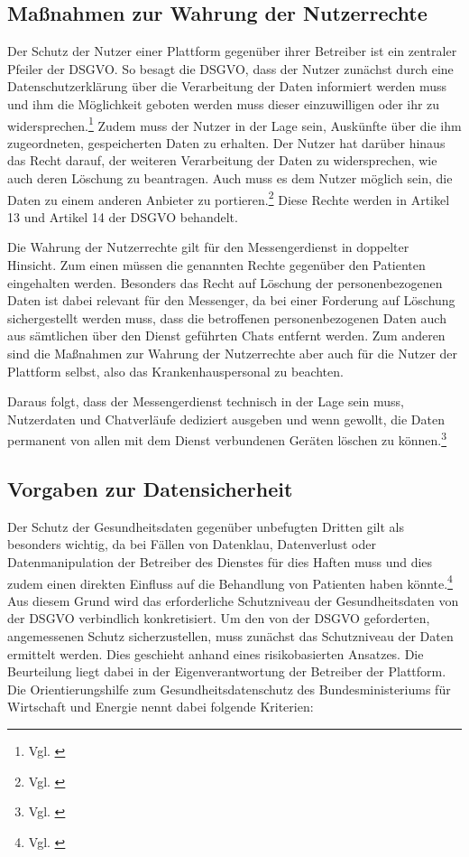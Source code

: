 \subsection{Maßnahmen zur Wahrung der Nutzerrechte}\label{subsection:mzwdn}
Der Schutz der Nutzer einer Plattform gegenüber ihrer Betreiber ist ein zentraler Pfeiler der DSGVO. So besagt die DSGVO, dass der Nutzer zunächst durch eine Datenschutzerklärung über die Verarbeitung der Daten informiert werden muss und ihm die Möglichkeit geboten werden muss dieser einzuwilligen oder ihr zu widersprechen.\footnote{Vgl. \cite[S. 3]{Bundesaerztekammer2020}} Zudem muss der Nutzer in der Lage sein, Auskünfte über die ihm zugeordneten, gespeicherten Daten zu erhalten. Der Nutzer hat darüber hinaus das Recht darauf, der weiteren Verarbeitung der Daten zu widersprechen, wie auch deren Löschung zu beantragen. Auch muss es dem Nutzer möglich sein, die Daten zu einem anderen Anbieter zu portieren.\footnote{Vgl. \cite[S. 30 ff.]{Bundesaerztekammer2020}} Diese Rechte werden in Artikel 13 und Artikel 14 der DSGVO behandelt.

Die Wahrung der Nutzerrechte gilt für den Messengerdienst in doppelter Hinsicht.
Zum einen müssen die genannten Rechte gegenüber den Patienten eingehalten werden. Besonders das Recht auf Löschung der personenbezogenen Daten ist dabei relevant für den Messenger, da bei einer Forderung auf Löschung sichergestellt werden muss, dass die betroffenen personenbezogenen Daten auch aus sämtlichen über den Dienst geführten Chats entfernt werden. Zum anderen sind die Maßnahmen zur Wahrung der Nutzerrechte aber auch für die Nutzer der Plattform selbst, also das Krankenhauspersonal zu beachten.

Daraus folgt, dass der Messengerdienst technisch in der Lage sein muss, Nutzerdaten und Chatverläufe dediziert ausgeben und wenn gewollt, die Daten permanent von allen mit dem Dienst verbundenen Geräten löschen zu können.\footnote{Vgl. \cite[S. 36 ff.]{Bundesaerztekammer2020}}

\subsection{Vorgaben zur Datensicherheit}\label{subsection:vzd}
Der Schutz der Gesundheitsdaten gegenüber unbefugten Dritten gilt als besonders wichtig, da bei Fällen von Datenklau, Datenverlust oder Datenmanipulation der Betreiber des Dienstes für dies Haften muss und dies zudem einen direkten Einfluss auf die Behandlung von Patienten haben könnte.\footnote{Vgl. \cite[S. 3]{Bundesaerztekammer2020}} Aus diesem Grund wird das erforderliche Schutzniveau der Gesundheitsdaten von der DSGVO verbindlich konkretisiert.
Um den von der DSGVO geforderten, angemessenen Schutz sicherzustellen, muss zunächst das Schutzniveau der Daten ermittelt werden.
Dies geschieht anhand eines risikobasierten Ansatzes. Die Beurteilung liegt dabei in der Eigenverantwortung der Betreiber der Plattform. Die \glqq Orientierungshilfe zum Gesundheitsdatenschutz\grqq{} des Bundesministeriums für Wirtschaft und Energie nennt dabei folgende Kriterien:

